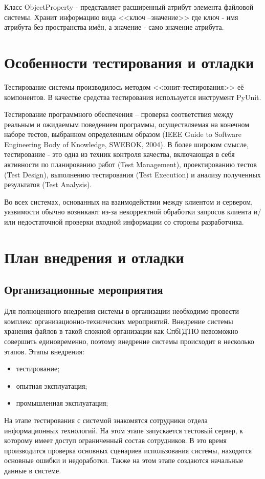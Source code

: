 \documentclass[utf8,usehyperref,12pt]{G7-32}
\begin{document}
Класс ObjectProperty - представляет расширенный атрибут элемента файловой системы. Хранит информацию вида <<ключ --значение>> где ключ - имя атрибута без пространства имён, а значение - само значение атрибута.

\section{Особенности тестирования и отладки}

Тестирование системы производилось методом <<юнит-тестирования>> её компонентов. В качестве средства тестирования используется инструмент PyUnit. 

Тестирование программного обеспечения – проверка соответствия между реальным и ожидаемым поведением программы, осуществляемая на конечном наборе тестов, выбранном определенным образом (IEEE Guide to Software Engineering Body of Knowledge, SWEBOK, 2004). В более широком смысле, тестирование - это одна из техник контроля качества, включающая в  себя активности по планированию работ (Test Management), проектированию тестов (Test Design), выполнению тестирования (Test Execution) и анализу полученных результатов (Test Analysis).

Во всех системах, основанных на взаимодействии между клиентом и сервером, уязвимости обычно возникают из-за некорректной обработки запросов клиента и/или недостаточной проверки входной информации со стороны разработчика. 

\section{План внедрения и отладки}
\subsection{Организационные мероприятия}
Для полноценного внедрения системы в организации необходимо провести комплекс организационно-технических мероприятий. Внедрение системы хранения файлов в такой сложной организации как СпбГДТЮ невозможно совершить единовременно, поэтому внедрение системы происходит в несколько этапов. Этапы внедрения:
\begin{itemize}
 \item тестирование;
 \item опытная эксплуатация;
 \item промышленная эксплуатация;
\end{itemize}

На этапе тестирования с системой знакомятся сотрудники отдела информационных технологий. На этом этапе запускается тестовый сервер, к которому имеет доступ ограниченный состав сотрудников. В это время производится проверка основных сценариев использования системы, находятся основные ошибки и недоработки. Также на этом этапе создаются начальные данные в системе.
\end{document}
